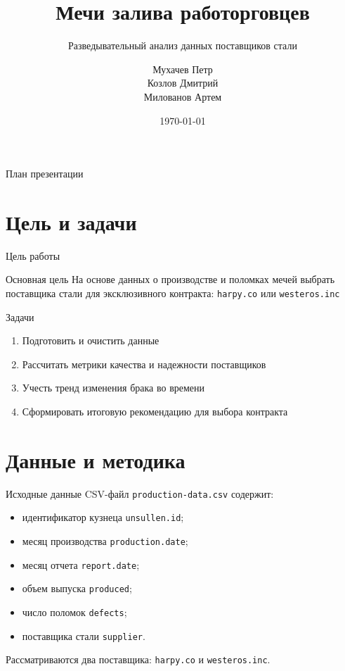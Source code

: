 \documentclass[12pt]{beamer}
\title{Мечи залива работорговцев}
\subtitle{Разведывательный анализ данных поставщиков стали}
\author{ Мухачев Петр \\Козлов Дмитрий \\Милованов Артем }
\date{\today}
\begin{document}
\begin{frame}
    \titlepage
\end{frame}

\begin{frame}{План презентации}
    \tableofcontents
\end{frame}

\section{Цель и задачи}

\begin{frame}{Цель работы}
    \begin{block}{Основная цель}
        На основе данных о производстве и поломках мечей выбрать поставщика стали
        для эксклюзивного контракта: \texttt{harpy.co} или \texttt{westeros.inc}
    \end{block}
\end{frame}

\begin{frame}{Задачи}
    \begin{enumerate}
        \item Подготовить и очистить данные
        \item Рассчитать метрики качества и надежности поставщиков
        \item Учесть тренд изменения брака во времени
        \item Сформировать итоговую рекомендацию для выбора контракта
    \end{enumerate}
\end{frame}

\section{Данные и методика}

\begin{frame}{Исходные данные}
    CSV-файл \texttt{production-data.csv} содержит:
    \begin{itemize}
        \item идентификатор кузнеца \texttt{unsullen.id};
        \item месяц производства \texttt{production.date};
        \item месяц отчета \texttt{report.date};
        \item объем выпуска \texttt{produced};
        \item число поломок \texttt{defects};
        \item поставщика стали \texttt{supplier}.
    \end{itemize}

    \vspace{0.3cm}
    Рассматриваются два поставщика: \texttt{harpy.co} и \texttt{westeros.inc}.
\end{frame}
\end{document}
